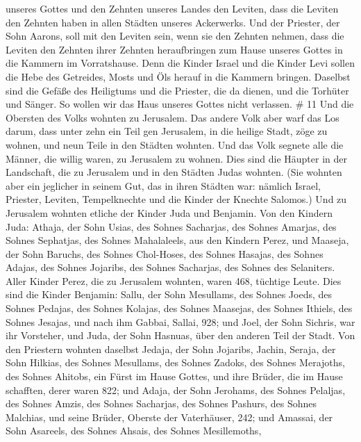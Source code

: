 unseres Gottes und den Zehnten unseres Landes den Leviten, dass die
Leviten den Zehnten haben in allen Städten unseres Ackerwerks.
 Und der Priester, der Sohn Aarons, soll mit den Leviten
sein, wenn sie den Zehnten nehmen, dass die Leviten den Zehnten ihrer
Zehnten heraufbringen zum Hause unseres Gottes in die Kammern im
Vorratshause.  Denn die Kinder Israel und die Kinder Levi
sollen die Hebe des Getreides, Mosts und Öls herauf in die Kammern
bringen. Daselbst sind die Gefäße des Heiligtums und die Priester, die
da dienen, und die Torhüter und Sänger. So wollen wir das Haus unseres
Gottes nicht verlassen. \# 11  Und die Obersten des Volks
wohnten zu Jerusalem. Das andere Volk aber warf das Los darum, dass
unter zehn ein Teil gen Jerusalem, in die heilige Stadt, zöge zu wohnen,
und neun Teile in den Städten wohnten.  Und das Volk segnete
alle die Männer, die willig waren, zu Jerusalem zu wohnen. 
Dies sind die Häupter in der Landschaft, die zu Jerusalem und in den
Städten Judas wohnten. (Sie wohnten aber ein jeglicher in seinem Gut,
das in ihren Städten war: nämlich Israel, Priester, Leviten,
Tempelknechte und die Kinder der Knechte Salomos.)  Und zu
Jerusalem wohnten etliche der Kinder Juda und Benjamin. Von den Kindern
Juda: Athaja, der Sohn Usias, des Sohnes Sacharjas, des Sohnes Amarjas,
des Sohnes Sephatjas, des Sohnes Mahalaleels, aus den Kindern Perez,
 und Maaseja, der Sohn Baruchs, des Sohnes Chol-Hoses, des
Sohnes Hasajas, des Sohnes Adajas, des Sohnes Jojaribs, des Sohnes
Sacharjas, des Sohnes des Selaniters.  Aller Kinder Perez,
die zu Jerusalem wohnten, waren 468, tüchtige Leute.  Dies
sind die Kinder Benjamin: Sallu, der Sohn Mesullams, des Sohnes Joeds,
des Sohnes Pedajas, des Sohnes Kolajas, des Sohnes Maasejas, des Sohnes
Ithiels, des Sohnes Jesajas,  und nach ihm Gabbai, Sallai,
928;  und Joel, der Sohn Sichris, war ihr Vorsteher, und
Juda, der Sohn Hasnuas, über den anderen Teil der Stadt. 
Von den Priestern wohnten daselbst Jedaja, der Sohn Jojaribs, Jachin,
 Seraja, der Sohn Hilkias, des Sohnes Mesullams, des Sohnes
Zadoks, des Sohnes Merajoths, des Sohnes Ahitobs, ein Fürst im Hause
Gottes,  und ihre Brüder, die im Hause schafften, derer
waren 822; und Adaja, der Sohn Jerohams, des Sohnes Pelaljas, des Sohnes
Amzis, des Sohnes Sacharjas, des Sohnes Pashurs, des Sohnes Malchias,
 und seine Brüder, Oberste der Vaterhäuser, 242; und
Amassai, der Sohn Asareels, des Sohnes Ahsais, des Sohnes Mesillemoths,
